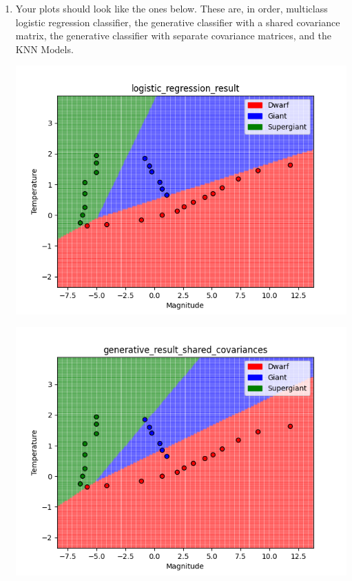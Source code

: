 \documentclass[submit]{harvardml}
\begin{document}
        \begin{enumerate}


        \item Your plots should look like the ones below.
        These are, in order, multiclass logistic regression classifier, the generative classifier with a shared covariance matrix, the generative classifier with separate covariance matrices, and the KNN Models. \\


        \begin{center}
            \includegraphics[scale=0.5]{solutions/logistic_regression_result.png}
        \end{center}
        \begin{center}
            \includegraphics[scale=0.5]{solutions/generative_result_shared_covariances.png}
        \end{center}


\end{enumerate}
\end{document}
